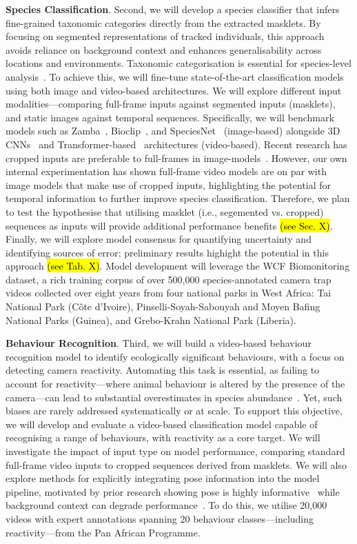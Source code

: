 \textbf{Species Classification}. Second, we will develop a species classifier that infers fine-grained taxonomic categories directly from the extracted masklets. By focusing on segmented representations of tracked individuals, this approach avoids reliance on background context and enhances generalisability across locations and environments. Taxonomic categorisation is essential for species-level analysis~\cite{}. To achieve this, we will fine-tune state-of-the-art classification models using both image and video-based architectures. We will explore different input modalities—comparing full-frame inputs against segmented inputs (masklets), and static images against temporal sequences. Specifically, we will benchmark models such as Zamba~\cite{}, Bioclip~\cite{}, and SpeciesNet~\cite{} (image-based) alongside 3D CNNs~\cite{} and Transformer-based~\cite{} architectures (video-based). Recent research has cropped inputs are preferable to full-frames in image-models~\cite{}. However, our own internal experimentation has shown full-frame video models are on par with image models that make use of cropped inputs, highlighting the potential for temporal information to further improve species classification. Therefore, we plan to test the hypothesise that utilising masklet (i.e., segemented vs. cropped) sequences as inputs will provide additional performance benefits \hl{(see Sec. X)}. Finally, we will explore model consensus for quantifying uncertainty and identifying sources of error; preliminary results highight the potential in this approach \hl{(see Tab. X)}. Model development will leverage the WCF Biomonitoring dataset, a rich training corpus of over 500,000 species-annotated camera trap videos collected over eight years from four national parks in West Africa: Tai National Park (Côte d’Ivoire), Pinselli-Soyah-Sabouyah and Moyen Bafing National Parks (Guinea), and Grebo-Krahn National Park (Liberia).


\textbf{Behaviour Recognition}. Third, we will build a video-based behaviour recognition model to identify ecologically significant behaviours, with a focus on detecting camera reactivity. Automating this task is essential, as failing to account for reactivity—where animal behaviour is altered by the presence of the camera—can lead to substantial overestimates in species abundance~\cite{}. Yet, such biases are rarely addressed systematically or at scale. To support this objective, we will develop and evaluate a video-based classification model capable of recognising a range of behaviours, with reactivity as a core target. We will investigate the impact of input type on model performance, comparing standard full-frame video inputs to cropped sequences derived from masklets. We will also explore methods for explicitly integrating pose information into the model pipeline, motivated by prior research showing pose is highly informative~\cite{} while background context can degrade performance~\cite{}. To do this, we utilise 20,000 videos with expert annotations spanning 20 behaviour classes—including reactivity—from the Pan African Programme.

